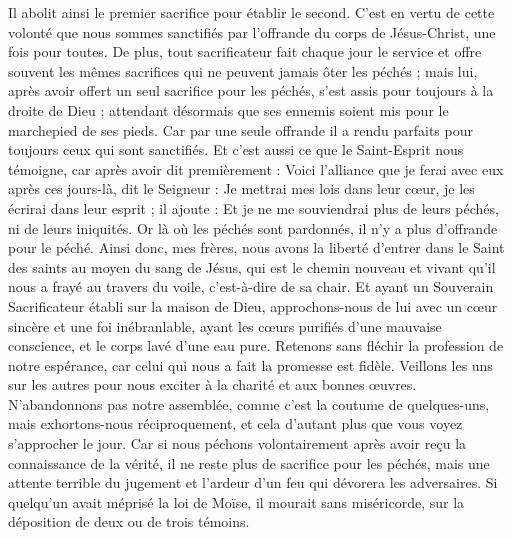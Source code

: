 \begin{multicols}{2}
Il abolit ainsi le premier sacrifice pour établir le second.
C’est en vertu de cette volonté que nous sommes sanctifiés par l’offrande du corps de Jésus-Christ, une fois pour toutes.
De plus, tout sacrificateur fait chaque jour le service et offre souvent les mêmes sacrifices qui ne peuvent jamais ôter les péchés ;
mais lui, après avoir offert un seul sacrifice pour les péchés, s’est assis pour toujours à la droite de Dieu ;
attendant désormais que ses ennemis  soient mis pour le marchepied de ses pieds.
Car par une seule offrande il a rendu parfaits pour toujours ceux qui sont sanctifiés.
Et c'est aussi ce que le Saint-Esprit nous témoigne, car après avoir dit premièrement :
Voici l'alliance que je ferai avec eux après ces jours-là, dit le Seigneur : Je mettrai mes lois dans leur cœur, je les écrirai dans leur esprit ; il ajoute :
Et je ne me souviendrai plus de leurs péchés, ni de leurs iniquités.
Or là où les péchés sont pardonnés, il n'y a plus d’offrande pour le péché.
Ainsi donc, mes frères, nous avons la liberté d'entrer dans le Saint des saints au moyen du sang de Jésus,
qui est le chemin nouveau et vivant qu'il nous a frayé au travers du voile, c’est-à-dire de sa chair.
Et ayant un Souverain Sacrificateur établi sur la maison de Dieu,
approchons-nous de lui avec un cœur sincère et une foi inébranlable, ayant les cœurs purifiés d’une mauvaise conscience, et le corps lavé d’une eau pure.
Retenons sans fléchir la profession de notre espérance, car celui qui nous a fait la promesse est fidèle.
Veillons les uns sur les autres pour nous exciter à la charité et aux bonnes œuvres.
N’abandonnons pas notre assemblée, comme c’est la coutume de quelques-uns, mais exhortons-nous réciproquement, et cela d'autant plus que vous voyez s’approcher le jour.
Car si nous péchons volontairement après avoir reçu la connaissance de la vérité, il ne reste plus de sacrifice pour les péchés,
mais une attente terrible du jugement et l'ardeur d'un feu qui dévorera les adversaires.
Si quelqu'un avait méprisé la loi de Moïse, il mourait sans miséricorde, sur la déposition de deux ou de trois témoins.

\end{multicols}
